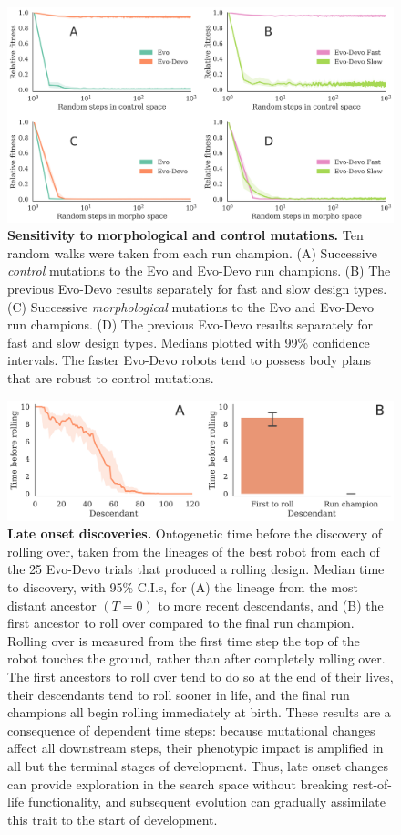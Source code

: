 \begin{figure}[t]
\centering
\includegraphics[width=\linewidth]{Chapter04/Fig5}
\caption{\label{fig-random-walks}\textbf{Sensitivity to morphological and control mutations.}
Ten random walks were taken from each run champion.
(A) Successive \textit{control} mutations to the Evo and Evo-Devo run champions.
(B) The previous Evo-Devo results separately for fast and slow design types.
(C) Successive \textit{morphological} mutations to the Evo and Evo-Devo run champions.
(D) The previous Evo-Devo results separately for fast and slow design types. Medians plotted with 99\% confidence intervals.
The faster Evo-Devo robots tend to possess body plans that are robust to control mutations.}
\end{figure}

\begin{figure}[t]
\centering
\includegraphics[width=0.9\linewidth]{Chapter04/Fig6}
\caption{\label{fig-discovery}\textbf{Late onset discoveries.} Ontogenetic time before the discovery of rolling over, taken from the lineages of the best robot from each of the 25 Evo-Devo trials that produced a rolling design. Median time to discovery, with 95\% C.I.s, for (A) the lineage from the most distant ancestor $(T=0)$ to more recent descendants, and (B) the first ancestor to roll over compared to the final run champion. 
Rolling over is measured from the first time step the top of the robot touches the ground, rather than after completely rolling over. 
The first ancestors to roll over tend to do so at the end of their lives, their descendants tend to roll sooner in life, and the final run champions all begin rolling immediately at birth. 
These results are a consequence of dependent time steps: 
because mutational changes affect all downstream steps, their phenotypic impact is amplified in all but the terminal stages of development. Thus, late onset changes can provide exploration in the search space without breaking rest-of-life functionality, and subsequent evolution can gradually assimilate this trait to the start of development.}
\end{figure}



